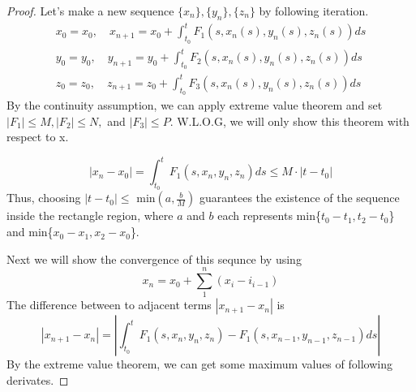 \documentclass[a4paper,10pt]{article}
\begin{document}
    \begin{proof}
        Let's make a new sequence $\{ x_n\}, \{ y_n\}, \{ z_n\}$ by following iteration.
        \begin{eqnarray*}
            x_0 = x_0, \quad x_{n+1} = x_0 + \int_{t_0}^{t} F_1(s, x_n(s), y_n(s), z_n(s)) ds \\
            y_0 = y_0, \quad y_{n+1} = y_0 + \int_{t_0}^{t} F_2(s, x_n(s), y_n(s), z_n(s)) ds \\
            z_0 = z_0, \quad z_{n+1} = z_0 + \int_{t_0}^{t} F_3(s, x_n(s), y_n(s), z_n(s)) ds
        \end{eqnarray*}
        By the continuity assumption, we can apply extreme value theorem and set $|F_1| \leq M, |F_2| \leq N,$ and $|F_3| \leq P$. W.L.O.G, we will only show this theorem with respect to x.

        \begin{displaymath}
            |x_n - x_0| = \int_{t_0}^{t} F_1(s, x_n, y_n, z_n) ds \leq M \cdot |t - t_0|
        \end{displaymath}
        Thus, choosing $|t - t_0| \leq$ min$(a, \frac{b}{M})$ guarantees the existence of the sequence inside the rectangle region, where $a$ and $b$ each represents min\{$t_0 - t_1, t_2 - t_0$\} and min\{$x_0 - x_1, x_2 - x_0$\}.

        Next we will show the convergence of this sequnce by using
        \begin{displaymath}
            x_n = x_0 + \sum_{1}^{n} (x_i - i_{i-1})
        \end{displaymath}
        The difference between to adjacent terms $|x_{n+1} - x_{n}|$ is 
        \begin{displaymath}
            |x_{n+1} - x_{n}| = \left| \int_{t_0}^t F_1(s, x_{n}, y_{n}, z_{n}) - F_1(s, x_{n-1}, y_{n-1}, z_{n-1}) ds \right|
        \end{displaymath}
        By the extreme value theorem, we can get some maximum values of following derivates.


\end{proof}
\end{document}
